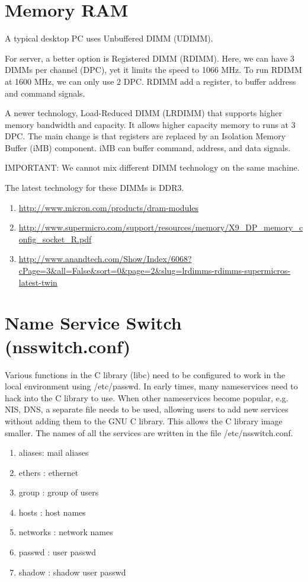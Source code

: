 \section{Memory RAM}

A typical desktop PC uses Unbuffered DIMM (UDIMM). 


For server, a better option is Registered DIMM (RDIMM). Here, we can have 3
DIMMs per channel (DPC), yet it limits the speed to 1066 MHz. To run RDIMM at
1600 MHz, we can only use 2 DPC. RDIMM add a register, to buffer address and
command signals. 


A newer technology, Load-Reduced DIMM (LRDIMM) that supports higher memory
bandwidth and capacity. It allows higher capacity memory to runs at 3 DPC. The
main change is that registers are replaced by an Isolation Memory Buffer
(iMB) component. iMB can buffer command, address, and data signals.  


IMPORTANT: We cannot mix different DIMM technology on the same machine. 


The latest technology for these DIMMs is DDR3. 

\begin{enumerate}
  \item \url{http://www.micron.com/products/dram-modules}
  \item
  \url{http://www.supermicro.com/support/resources/memory/X9_DP_memory_config_socket_R.pdf}
  
  \item
  \url{http://www.anandtech.com/Show/Index/6068?cPage=3&all=False&sort=0&page=2&slug=lrdimms-rdimms-supermicros-latest-twin}
\end{enumerate}
\section{Name Service Switch (nsswitch.conf)}

Various functions in the C library (libc) need to be configured to work in the
local environment using /etc/passwd. In early times, many nameservices need to
hack into the C library to use. When other nameservices become popular, e.g.
NIS, DNS, a separate file needs to be used, allowing users to add new services
without adding them to the GNU C library. This allows the C library image
smaller. The names of all the services are written in the file
/etc/nsswitch.conf. 
\begin{enumerate}
  \item aliases: mail aliases
  \item ethers : ethernet
  \item group : group of users
  \item hosts : host names
  \item networks : network names
  \item passwd : user passwd
  \item shadow : shadow user passwd
\end{enumerate}

